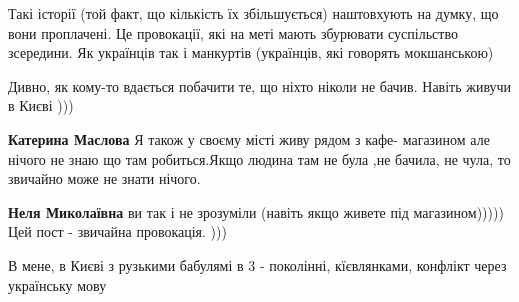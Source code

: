 \begin{itemize}
Такі історії (той факт, що кількість їх збільшується) наштовхують на думку, що
вони проплачені. Це провокації, які на меті мають збурювати суспільство
зсередини. Як українців так і манкуртів (українців, які говорять мокшанською)

 

Дивно, як кому-то вдається побачити те, що ніхто ніколи не бачив. Навіть живучи
в Києві )))

\begin{itemize}
 
\textbf{Катерина Маслова} Я також у своєму місті живу рядом з кафе- магазином але нічого не знаю що там робиться.Якщо людина там не була ,не бачила, не чула, то звичайно може не знати нічого.

 
\textbf{Неля Миколаївна} ви так і не зрозуміли (навіть якщо живете під магазином))))) Цей пост - звичайна провокація. )))
\end{itemize}

 
В мене, в Києві з рузькими бабулямі в 3 - поколінні, кїєвлянками, конфлікт через українську мову

\begin{itemize}
 

\end{itemize}
\end{itemize}

